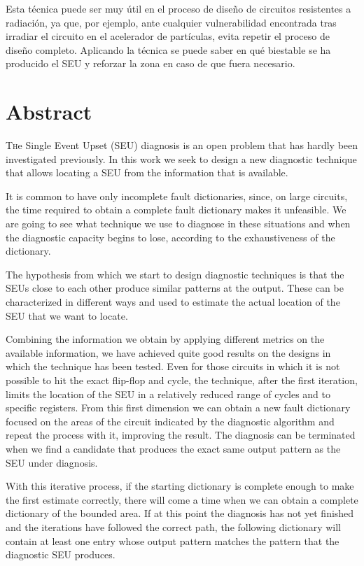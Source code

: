 Esta técnica puede ser muy útil en el proceso de diseño de circuitos resistentes a
radiación, ya que, por ejemplo, ante cualquier vulnerabilidad encontrada tras
irradiar el circuito en el acelerador de partículas, evita repetir el proceso de
diseño completo. Aplicando la técnica se puede saber en qué biestable se ha
producido el \gls{SEU} y reforzar la zona en caso de que fuera necesario.


\chapter*{Abstract}
\pagestyle{especial}
{}

\lettrine[lraise=-0.1, lines=2, loversize=0.2]{T}{h}e Single Event Upset (SEU) 
diagnosis is an open problem that has hardly been investigated previously. In this
work we seek to design a new diagnostic technique that allows locating a SEU from 
the information that is available.

It is common to have only incomplete fault dictionaries, since, on large circuits,
the time required to obtain a complete fault dictionary makes it unfeasible. We 
are going to see what technique we use to diagnose in these situations and when 
the diagnostic capacity begins to lose, according to the exhaustiveness of the 
dictionary.

The hypothesis from which we start to design diagnostic techniques is that the 
SEUs close to each other produce similar patterns at the output. These can be 
characterized in different ways and used to estimate the actual location of the 
SEU that we want to locate.

Combining the information we obtain by applying different metrics on the available
information, we have achieved quite good results on the designs in which the 
technique has been tested. Even for those circuits in which it is not possible to 
hit the exact flip-flop and cycle, the technique, after the first iteration, 
limits the location of the SEU in a relatively reduced range of cycles and to 
specific registers. From this first dimension we can obtain a new fault dictionary
focused on the areas of the circuit indicated by the diagnostic algorithm and 
repeat the process with it, improving the result. The diagnosis can be terminated 
when we find a candidate that produces the exact same output pattern as the SEU 
under diagnosis.

With this iterative process, if the starting dictionary is complete enough to make
the first estimate correctly, there will come a time when we can obtain a complete
dictionary of the bounded area. If at this point the diagnosis has not yet finished
and the iterations have followed the correct path, the following dictionary will 
contain at least one entry whose output pattern matches the pattern that the 
diagnostic SEU produces.


